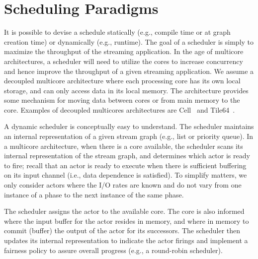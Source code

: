 \section{Scheduling Paradigms}


It is possible to devise a schedule statically (e.g., compile time or
at graph creation time) or dynamically (e.g., runtime). The goal of a
scheduler is simply to maximize the throughput of the streaming
application. In the age of multicore architectures, a scheduler will
need to utilize the cores to increase concurrency and hence improve
the throughput of a given streaming application.  We assume a
decoupled multicore architecture where each processing core has its
own local storage, and can only access data in its local memory. The
architecture provides some mechanism for moving data between cores or
from main memory to the core. Examples of decoupled multicores
architectures are Cell~\cite{cell} and Tile64~\cite{tilera}.

A dynamic scheduler is conceptually easy to understand. The scheduler
maintains an internal representation of a given stream graph (e.g.,
list or priority queue). In a multicore architecture, when there is a
core available, the scheduler scans its internal representation of the
stream graph, and determines which actor is ready to fire; recall that
an actor is ready to execute when there is sufficient buffering on its
input channel (i.e., data dependence is satisfied).  To simplify
matters, we only consider actors where the I/O rates are known and do
not vary from one instance of a phase to the next instance of the same
phase. 

The scheduler assigns the actor to the available core. The core is
also informed where the input buffer for the actor resides in memory,
and where in memory to commit (buffer) the output of the actor for its
successors. The scheduler then updates its internal representation to
indicate the actor firings and implement a fairness policy to assure
overall progress (e.g., a round-robin scheduler).

